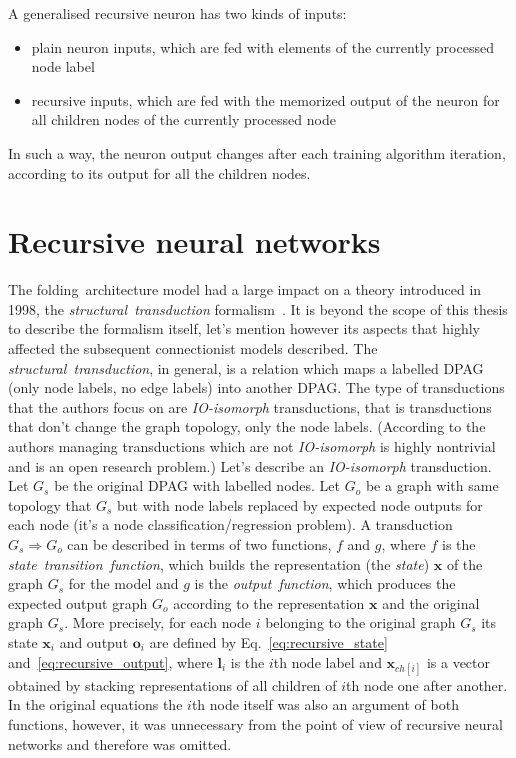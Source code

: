 \noindent A generalised recursive neuron has two kinds of inputs:
\begin{itemize}
\item plain neuron inputs, which are fed with elements of the currently processed node label
\item recursive inputs, which are fed with the memorized output of the neuron for all children nodes of the currently processed node
\end{itemize}

\noindent In such a way, the neuron output changes after each training algorithm iteration, according to its output for all the children nodes.

\section{Recursive neural networks}
The folding~architecture model had a large impact on a theory introduced in 1998, the \emph{structural~transduction} formalism~\cite{frasconi1998general}. It is beyond the scope of this thesis to describe the formalism itself, let's mention however its aspects that highly affected the subsequent connectionist models described. The \emph{structural~transduction}, in general, is a relation which maps a labelled DPAG (only node labels, no edge labels) into another DPAG. The type of transductions that the authors focus on are \emph{IO-isomorph} transductions, that is transductions that don't change the graph topology, only the node labels. (According to the authors managing transductions which are not \emph{IO-isomorph} is highly nontrivial and is an open research problem.) Let's describe an \emph{IO-isomorph} transduction. Let $G_s$ be the original DPAG with labelled nodes. Let $G_o$ be a graph with same topology that $G_s$ but with node labels replaced by expected node outputs for each node (it's a node classification/regression problem). A transduction $G_s \Rightarrow G_o$ can be described in terms of two functions, $f$ and $g$, where $f$ is the \emph{state~transition~function}, which builds the representation (the \emph{state}) $\bm{x}$ of the graph $G_s$ for the model and $g$ is the \emph{output~function}, which produces the expected output graph $G_o$ according to the representation $\bm{x}$ and the original graph $G_s$. More precisely, for each node $i$ belonging to the original graph $G_s$ its state $\bm{x}_i$ and output ${\bm{o}}_i$ are defined by Eq.~\ref{eq:recursive_state} and~\ref{eq:recursive_output}, where $\bm{l}_i$ is the $i$th node label and $\bm{x}_{ch[i]}$ is a vector obtained by stacking representations of all children of $i$th node one after another. In the original equations the $i$th node itself was also an argument of both functions, however, it was unnecessary from the point of view of recursive neural networks and therefore was omitted. 

